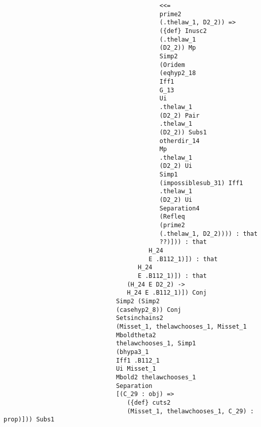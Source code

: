 \documentclass[12pt]{article}
\begin{document}
\begin{verbatim}
                                           <<= 
                                           prime2 
                                           (.thelaw_1, D2_2)) => 
                                           ({def} Inusc2 
                                           (.thelaw_1 
                                           (D2_2)) Mp 
                                           Simp2 
                                           (Oridem 
                                           (eqhyp2_18 
                                           Iff1 
                                           G_13 
                                           Ui 
                                           .thelaw_1 
                                           (D2_2) Pair 
                                           .thelaw_1 
                                           (D2_2)) Subs1 
                                           otherdir_14 
                                           Mp 
                                           .thelaw_1 
                                           (D2_2) Ui 
                                           Simp1 
                                           (impossiblesub_31) Iff1 
                                           .thelaw_1 
                                           (D2_2) Ui 
                                           Separation4 
                                           (Refleq 
                                           (prime2 
                                           (.thelaw_1, D2_2)))) : that 
                                           ??)])) : that 
                                        H_24 
                                        E .B112_1)]) : that 
                                     H_24 
                                     E .B112_1)]) : that 
                                  (H_24 E D2_2) -> 
                                  H_24 E .B112_1)]) Conj 
                               Simp2 (Simp2 
                               (casehyp2_8)) Conj 
                               Setsinchains2 
                               (Misset_1, thelawchooses_1, Misset_1 
                               Mboldtheta2 
                               thelawchooses_1, Simp1 
                               (bhypa3_1 
                               Iff1 .B112_1 
                               Ui Misset_1 
                               Mbold2 thelawchooses_1 
                               Separation 
                               [(C_29 : obj) => 
                                  ({def} cuts2 
                                  (Misset_1, thelawchooses_1, C_29) : prop)])) Subs1 

\end{verbatim}
\end{document}
